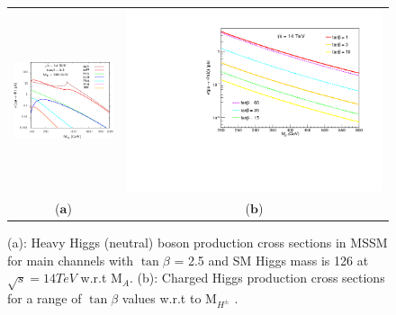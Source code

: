 \begin{figure}[htp]
\centering
\begin{tabular}{cc}
\hspace{0.3cm}
\includegraphics[scale=0.61]{fig/chapt2/Heavy_higgs_prod_xsec.png}
& \hspace{-0.3cm} \includegraphics[trim={8cm 6.0cm 0 0},clip, scale=0.4]{fig/chapt2/plots_xs_Htb_14TeV.png}\\
  \qquad\qquad\qquad\qquad ($\mathbf{a}$)\qquad\qquad\qquad&($\mathbf{b}$)\\
\end{tabular}
\caption{(a): Heavy Higgs (neutral) boson production cross sections in MSSM for main channels with $\tan\beta$ = 2.5 and SM Higgs mass is 126 at $\sqrt{s} = 14 TeV$ w.r.t M$_{A}$. (b): Charged Higgs production cross sections for a range of $\tan\beta$ values w.r.t to M$_{H^{\pm}}$ \cite{Djouadi:2013vqa,Djouadi:2015jea}. }\label{fig:Heavy_H_prod_xsec}
\end{figure}
